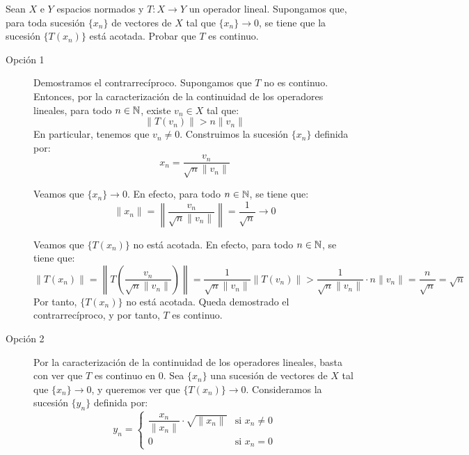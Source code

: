 \begin{ejercicio}
Sean $X$ e $Y$ espacios normados y $T: X \longrightarrow Y$ un operador lineal. Supongamos que, para toda sucesión $\{x_n\}$ de vectores de $X$ tal que $\{x_n\} \to 0$, se tiene que la sucesión $\{T(x_n)\}$ está acotada. Probar que $T$ es continuo.
\begin{description}
    \item[Opción 1] Demostramos el contrarrecíproco. Supongamos que $T$ no es continuo. Entonces, por la caracterización de la continuidad de los operadores lineales, para todo $n \in \mathbb{N}$, existe $v_n \in X$ tal que:
    \begin{equation*}
        \|T(v_n)\| > n \|v_n\|
    \end{equation*}
    En particular, tenemos que $v_n \neq 0$. Construimos la sucesión $\{x_n\}$ definida por:
    \begin{equation*}
        x_n = \frac{v_n}{\sqrt{n}\|v_n\|}
    \end{equation*}

    Veamos que $\{x_n\} \to 0$. En efecto, para todo $n \in \mathbb{N}$, se tiene que:
    \begin{equation*}
        \|x_n\| = \left\|\frac{v_n}{\sqrt{n}\|v_n\|}\right\| = \frac{1}{\sqrt{n}} \to 0
    \end{equation*}

    Veamos que $\{T(x_n)\}$ no está acotada. En efecto, para todo $n \in \mathbb{N}$, se tiene que:
    \begin{equation*}
        \|T(x_n)\| = \left\|T\left(\frac{v_n}{\sqrt{n}\|v_n\|}\right)\right\| = \frac{1}{\sqrt{n}\|v_n\|} \|T(v_n)\| > \frac{1}{\sqrt{n}\|v_n\|} \cdot n \|v_n\| = \dfrac{n}{\sqrt{n}} = \sqrt{n}
    \end{equation*}
    Por tanto, $\{T(x_n)\}$ no está acotada. Queda demostrado el contrarrecíproco, y por tanto, $T$ es continuo.
    
    \item[Opción 2] Por la caracterización de la continuidad de los operadores lineales, basta con ver que $T$ es continuo en $0$. Sea $\{x_n\}$ una sucesión de vectores de $X$ tal que $\{x_n\} \to 0$, y queremos ver que $\{T(x_n)\} \to 0$. Consideramos la sucesión $\{y_n\}$ definida por:
    \begin{equation*}
        y_n = \begin{cases}
            \dfrac{x_n}{\|x_n\|} \cdot \sqrt{\|x_n\|} & \text{si } x_n \neq 0\\
            0 & \text{si } x_n = 0
        \end{cases}
    \end{equation*}


\end{description}
\end{ejercicio}
